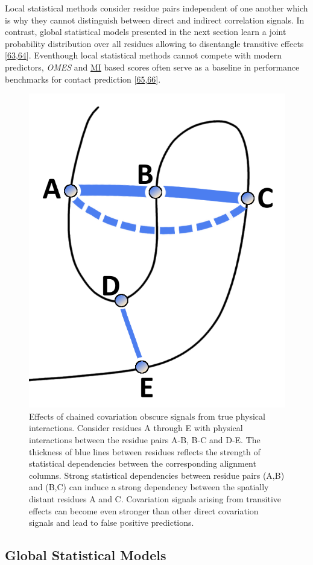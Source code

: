 \documentclass[11pt,a4paper,twoside]{book}
\theoremstyle{definition}
\theoremstyle{definition}
\theoremstyle{remark}
\begin{document}
Local statistical methods consider residue pairs independent of one
another which is why they cannot distinguish between direct and indirect
correlation signals. In contrast, global statistical models presented in
the next section learn a joint probability distribution over all
residues allowing to disentangle transitive effects
{[}\protect\hyperlink{ref-Burger2010}{63},\protect\hyperlink{ref-Weigt2009}{64}{]}.
Eventhough local statistical methods cannot compete with modern
predictors, \emph{OMES} and \protect\hyperlink{abbrev}{MI} based scores
often serve as a baseline in performance benchmarks for contact
prediction
{[}\protect\hyperlink{ref-DeJuan2013}{65},\protect\hyperlink{ref-Jones2012}{66}{]}.












\begin{figure}

{\centering \includegraphics[width=0.25\linewidth]{img/intro/transitive_effects} 

}

\caption{Effects of chained covariation obscure
signals from true physical interactions. Consider residues A through E
with physical interactions between the residue pairs A-B, B-C and D-E.
The thickness of blue lines between residues reflects the strength of
statistical dependencies between the corresponding alignment columns.
Strong statistical dependencies between residue pairs (A,B) and (B,C)
can induce a strong dependency between the spatially distant residues A
and C. Covariation signals arising from transitive effects can become
even stronger than other direct covariation signals and lead to false
positive predictions.}\label{fig:transitive-effect}
\end{figure}

\subsection{Global Statistical Models}\label{global-methods}
\end{document}
